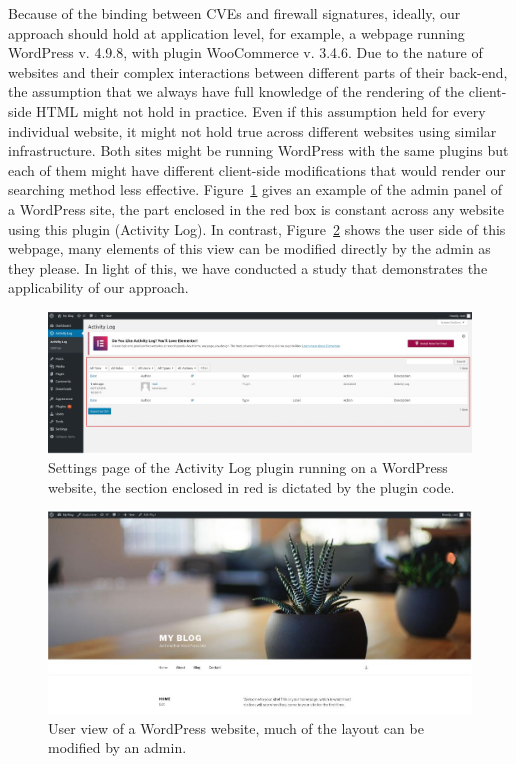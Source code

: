 \iffalse
Because of the binding between CVEs and firewall signatures, ideally, our approach should hold at application level, for example, a webpage running WordPress v. 4.9.8, with plugin WooCommerce v. 3.4.6. Due to the nature of websites and their complex interactions between different parts of their back-end, the assumption that we always have full knowledge of the rendering of the client-side HTML might not hold in practice. Even if this assumption held for every individual website, it might not hold true across different websites using similar infrastructure. Both sites might be running WordPress with the same plugins but each of them might have different client-side modifications that would render our searching method less effective. Figure~\ref{fig:admin_view} gives an example of the admin panel of a WordPress site, the part enclosed in the red box is constant across any website using this plugin (Activity Log). In contrast, Figure~\ref{fig:user_view} shows the user side of this webpage, many elements of this view can be modified directly by the admin as they please.  In light of this, we have conducted a study that demonstrates the applicability of our approach.

\begin{figure}[h]
	\includegraphics[scale=0.25]{img/admin_view.JPG}
	\caption{Settings page of the Activity Log plugin running on a WordPress website, the section enclosed in red is dictated by the plugin code.}
	\label{fig:admin_view}
\end{figure}

\begin{figure}[h]
	\includegraphics[scale=0.3]{img/user_view.JPG}
	\caption{User view of a WordPress website, much of the layout can be modified by an admin.}
	\label{fig:user_view}
\end{figure}

